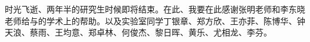 \cleardoublepage
{}
时光飞逝、两年半的研究生时候即将结束。在此、我要在此感谢张明老师和李东晓老师给与的学术上的帮助。以及实验室同学丁银章、郑方欣、王亦菲、陈博华、钟天浪、蔡雨、王均意、郑卓林、何俊杰、黎日晖、黄乐、尤相龙、李芬。